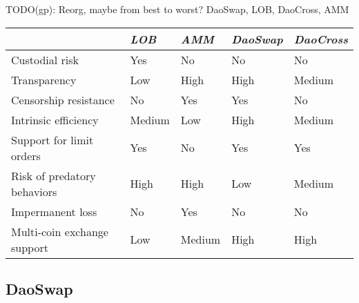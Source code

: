 \documentclass[11pt, reqno]{amsart}
\theoremstyle{definition}
\theoremstyle{remark}
\begin{document}
TODO(gp): Reorg, maybe from best to worst? DaoSwap, LOB, DaoCross, AMM

\begin{samepage}
	\begin{table}[h!]
		\centering
		\begin{tabular}{lllll}
			                            & \emph{LOB} & \emph{AMM} & \emph{DaoSwap} & \emph{DaoCross} \\
			\hline
			Custodial risk              & Yes        & No         & No             & No              \\
			Transparency                & Low        & High       & High           & Medium          \\
			Censorship resistance       & No         & Yes        & Yes            & No              \\
			Intrinsic efficiency        & Medium     & Low        & High           & Medium          \\
			Support for limit orders    & Yes        & No         & Yes            & Yes             \\
			Risk of predatory behaviors & High       & High       & Low            & Medium          \\
			Impermanent loss            & No         & Yes        & No             & No              \\
			Multi-coin exchange support & Low        & Medium     & High           & High            \\
			\hline
		\end{tabular}
	\end{table}
\end{samepage}

\subsection{DaoSwap}
\end{document}

